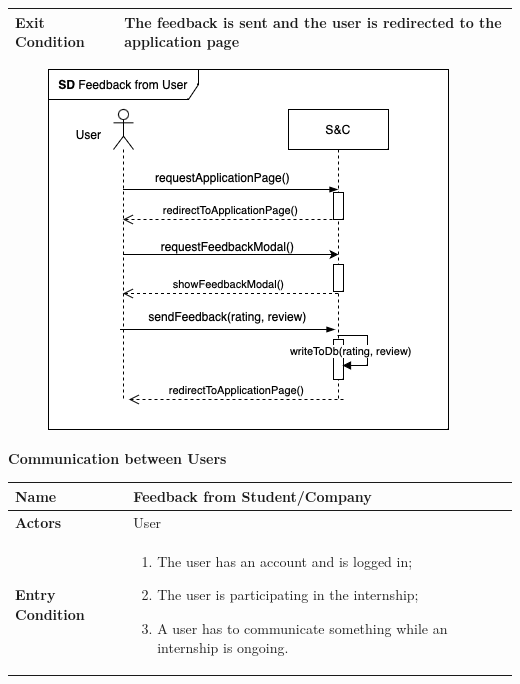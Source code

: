\begin{enumerate}[label=\textbf{[US\arabic*]}, left = 0pt, align = left, resume]
\begin{longtable}{|l|p{11cm}|}
                \textbf{Exit Condition} & 
                    The feedback is sent and the user is redirected to the application page \\
                \hline
                \hline
            \end{longtable}

            \begin{figure}[h!]
                \centering  \includegraphics{RASD/Images/UseCases/FeedbackFromUser.drawio.png}
                \label{fig:example}
            \end{figure}

            \newpage
            \item \textbf{Communication between Users}
            
            \begin{longtable}{|l|p{11cm}|}  
                \hline
                \textbf{Name} & 
                    \textbf{Feedback from Student/Company} \\
                \hline
                
                \textbf{Actors} & 
                    User\\
                \hline
                
                \textbf{Entry Condition} & 
                    \begin{enumerate}[label=\textbullet, itemsep=0em]
                        \item The user has an account and is logged in;
                        \item The user is participating in the internship;
                        \item A user has to communicate something while an internship is ongoing.
                    \end{enumerate} \\
                \hline
                

\end{longtable}
\end{enumerate}
